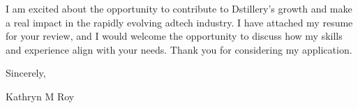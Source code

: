 \documentclass[line,overlapped]{res}
\begin{document}
\begin{resume}
I am excited about the opportunity to contribute to Dstillery's growth and make a real impact in the rapidly evolving adtech industry. I have attached my resume for your review, and I would welcome the opportunity to discuss how my skills and experience align with your needs. Thank you for considering my application.

Sincerely,

Kathryn M Roy

\end{resume}
\end{document}
